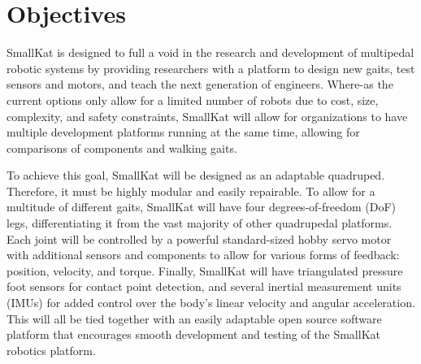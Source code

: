 



\section{Objectives}
SmallKat is designed to full a void in the research and development of multipedal robotic systems by providing researchers with a platform to design new gaits, test sensors and motors, and teach the next generation of engineers. Where-as the current options only allow for a limited number of robots due to cost,  size, complexity, and safety constraints, SmallKat will allow for organizations to have multiple development platforms running at  the  same time,  allowing  for comparisons of components and walking gaits.

To achieve this goal, SmallKat will be designed as an adaptable quadruped. Therefore, it must be highly modular and easily repairable. To allow for a multitude of different gaits, SmallKat will have four degrees-of-freedom (DoF) legs, differentiating it from the vast majority of other quadrupedal platforms. Each joint will be controlled by a powerful standard-sized hobby servo motor with additional sensors and components to allow for various forms of feedback: position, velocity, and torque. Finally, SmallKat will have triangulated pressure foot sensors for contact point detection, and several inertial measurement units (IMUs) for added control over the body's linear velocity and angular acceleration. This will all be tied together with an easily adaptable open source software platform that encourages smooth development and testing of the SmallKat robotics platform.


